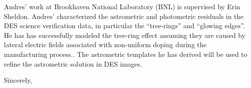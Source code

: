 \documentclass[12pt]{letter}
\begin{document}
\begin{letter}{}
Andres' work at Brookhaven National Laboratory (BNL) is supervised by Erin
Sheldon.  Andres' characterized the astrometric and photometric residuals in
the DES science verification data, in particular the ``tree-rings'' and
``glowing edges''. He has has successfully modeled the tree-ring effect
assuming they are caused by lateral electric fields associated with non-uniform
doping during the manufacturing
process.\cite{PlazasProceedings2014,Plazas2014}.  The astrometric templates he
has derived will be used to refine the astrometric solution in DES images.


\closing{Sincerely, }






\end{letter}
\end{document}
